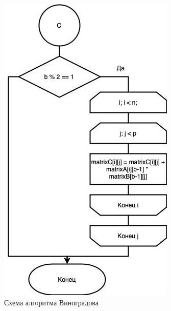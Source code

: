 \begin{figure}[h]
    \centering
    \includegraphics[width=0.6\linewidth]{img/WinogradPrD.jpg}
    \caption{Схема алгоритма Виноградова}
    \label{fig:mpr}
\end{figure}

